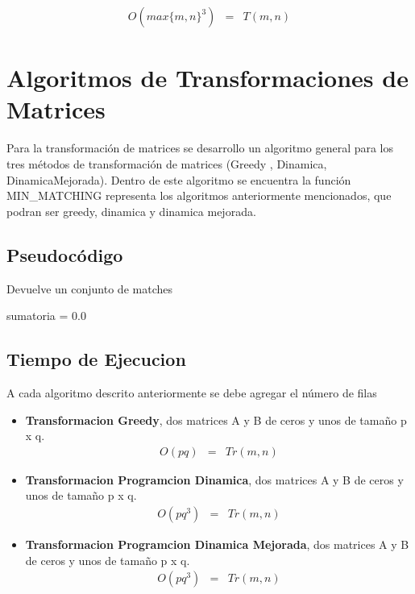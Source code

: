 \documentclass{article}
\begin{document}
\begin{eqnarray*}
    O(max\{m, n\}^3) &=& T(m, n)
\end{eqnarray*}

\section{Algoritmos de Transformaciones de Matrices}
Para la transformación de matrices se desarrollo un algoritmo general para los tres métodos de transformación de matrices (Greedy , Dinamica, DinamicaMejorada).
Dentro de este algoritmo se encuentra la función MIN\_MATCHING representa los algoritmos anteriormente mencionados, que podran ser greedy, dinamica y dinamica mejorada. 
\subsection{Pseudocódigo}
\begin{algorithm}
\caption{Devuelve un conjunto de matches}
\begin{algorithmic}[1]
            
        \EndFor
    \Else
        \State sumatoria = 0.0
         \EndFor
    \EndIf
\end{algorithmic}
\end{algorithm}
\newpage
\subsection{Tiempo de Ejecucion}
A cada algoritmo descrito anteriormente se debe agregar el número de filas
\begin{itemize}
    \item \textbf{Transformacion Greedy}, dos matrices A y B de ceros y unos de tamaño p x q. 
    \begin{eqnarray*}
        O(pq) &=& Tr(m, n)
    \end{eqnarray*}
    \item \textbf{Transformacion Programcion Dinamica}, dos matrices A y B de ceros y unos de tamaño p x q.
    \begin{eqnarray*}
        O(pq^3) &=& Tr(m, n)
    \end{eqnarray*}
    \item \textbf{Transformacion Programcion Dinamica Mejorada}, dos matrices A y B de ceros y unos de tamaño p x q.
    \begin{eqnarray*}
        O(pq^3) &=& Tr(m, n)
    \end{eqnarray*}
\end{itemize}
\newpage
\end{document}
